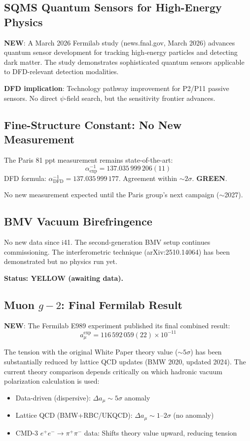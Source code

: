 \documentclass[11pt,a4paper]{article}
\newcommand{\GREEN}{\textcolor{dfdgreen}{\textbf{GREEN}}}
\newcommand{\YELLOW}{\textcolor{dfdyellow}{\textbf{YELLOW}}}
\newcommand{\NEW}{\textcolor{dfdblue}{\textbf{NEW}}}
\begin{document}
\subsection{SQMS Quantum Sensors for High-Energy Physics}

\textbf{\NEW}: A March 2026 Fermilab study (news.fnal.gov, March 2026) advances quantum sensor development for tracking high-energy particles and detecting dark matter. The study demonstrates sophisticated quantum sensors applicable to DFD-relevant detection modalities.

\textbf{DFD implication}: Technology pathway improvement for P2/P11 passive sensors. No direct $\psi$-field search, but the sensitivity frontier advances.

\subsection{Fine-Structure Constant: No New Measurement}

The Paris 81 ppt measurement remains state-of-the-art:
\begin{equation}
\alpha^{-1}_{\text{exp}} = 137.035\,999\,206(11)
\end{equation}
DFD formula: $\alpha^{-1}_{\text{DFD}} = 137.035\,999\,177$. Agreement within $\sim 2\sigma$. \GREEN.

No new measurement expected until the Paris group's next campaign ($\sim$2027).

\subsection{BMV Vacuum Birefringence}

No new data since i41. The second-generation BMV setup continues commissioning. The interferometric technique (arXiv:2510.14064) has been demonstrated but no physics run yet.

\textbf{Status: \YELLOW{} (awaiting data).}

\subsection{Muon $g-2$: Final Fermilab Result}

\textbf{\NEW}: The Fermilab E989 experiment published its final combined result:
\begin{equation}
a_\mu^{\text{exp}} = 116\,592\,059(22) \times 10^{-11}
\end{equation}

The tension with the original White Paper theory value ($\sim 5\sigma$) has been substantially reduced by lattice QCD updates (BMW 2020, updated 2024). The current theory comparison depends critically on which hadronic vacuum polarization calculation is used:
\begin{itemize}
\item Data-driven (dispersive): $\Delta a_\mu \sim 5\sigma$ anomaly
\item Lattice QCD (BMW+RBC/UKQCD): $\Delta a_\mu \sim 1$--$2\sigma$ (no anomaly)
\item CMD-3 $e^+e^- \to \pi^+\pi^-$ data: Shifts theory value upward, reducing tension
\end{itemize}
\end{document}

